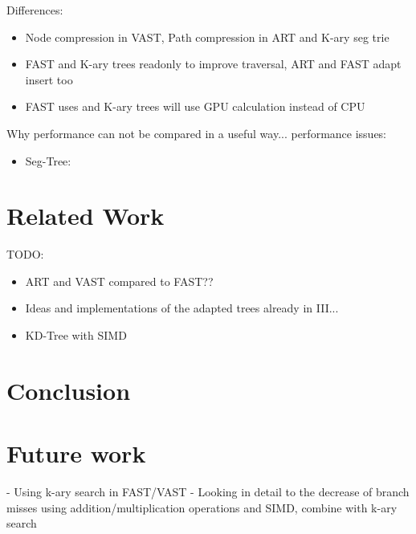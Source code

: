 \documentclass[conference]{IEEEtran}
\begin{document}

Differences:
\begin{itemize}
	\item Node compression in VAST, Path compression in ART and K-ary seg trie
	\item FAST and K-ary trees readonly to improve traversal, ART and FAST adapt insert too
	\item FAST uses and K-ary trees will use GPU calculation instead of CPU
\end{itemize}

Why performance can not be compared in a useful way...
performance issues:
\begin{itemize}
	\item Seg-Tree: 
\end{itemize}
\section{Related Work}
TODO:
\begin{itemize}
	\item ART and VAST compared to FAST??
	\item Ideas and implementations of the adapted trees already in III...
	\item KD-Tree with SIMD
\end{itemize}

\section{Conclusion}

\section{Future work}
- Using k-ary search in FAST/VAST
- Looking in detail to the decrease of branch misses using addition/multiplication operations and SIMD, combine with k-ary search
\end{document}
